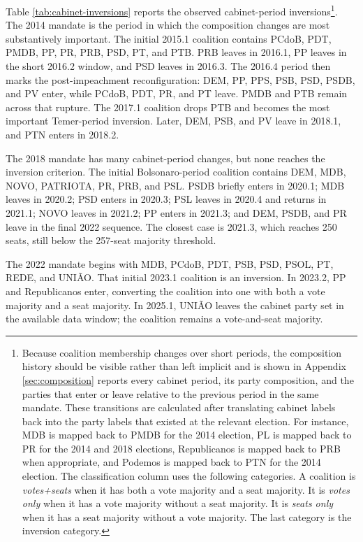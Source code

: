 \documentclass[11pt]{article}
\begin{document}


Table \ref{tab:cabinet-inversions} reports the observed cabinet-period
inversions\footnote{Because coalition membership changes over short periods, the
  composition history should be visible rather than left implicit and is shown
  in Appendix \ref{sec:composition} reports every cabinet period, its party
  composition, and the parties that enter or leave relative to the previous
  period in the same mandate. These transitions are calculated after translating
  cabinet labels back into the party labels that existed at the relevant
  election. For instance, MDB is mapped back to PMDB for the 2014 election, PL
  is mapped back to PR for the 2014 and 2018 elections, Republicanos is mapped
  back to PRB when appropriate, and Podemos is mapped back to PTN for the 2014
  election. The classification column uses the following categories. A coalition
  is \textit{votes+seats} when it has both a vote majority and a seat majority.
  It is \textit{votes only} when it has a vote majority without a seat majority.
  It is \textit{seats only} when it has a seat majority without a vote majority.
  The last category is the inversion category.}. The 2014 mandate is the period
in which the composition changes are most substantively important. The initial
2015.1 coalition contains PCdoB, PDT, PMDB, PP, PR, PRB, PSD, PT, and PTB. PRB
leaves in 2016.1, PP leaves in the short 2016.2 window, and PSD leaves in
2016.3. The 2016.4 period then marks the post-impeachment reconfiguration: DEM,
PP, PPS, PSB, PSD, PSDB, and PV enter, while PCdoB, PDT, PR, and PT leave. PMDB
and PTB remain across that rupture. The 2017.1 coalition drops PTB and becomes
the most important Temer-period inversion. Later, DEM, PSB, and PV leave in
2018.1, and PTN enters in 2018.2.

The 2018 mandate has many cabinet-period changes, but none reaches the inversion
criterion. The initial Bolsonaro-period coalition contains DEM, MDB, NOVO,
PATRIOTA, PR, PRB, and PSL. PSDB briefly enters in 2020.1; MDB leaves in
2020.2; PSD enters in 2020.3; PSL leaves in 2020.4 and returns in 2021.1; NOVO
leaves in 2021.2; PP enters in 2021.3; and DEM, PSDB, and PR leave in the final
2022 sequence. The closest case is 2021.3, which reaches 250 seats, still below
the 257-seat majority threshold.

The 2022 mandate begins with MDB, PCdoB, PDT, PSB, PSD, PSOL, PT, REDE, and
UNIÃO. That initial 2023.1 coalition is an inversion. In 2023.2, PP and
Republicanos enter, converting the coalition into one with both a vote majority
and a seat majority. In 2025.1, UNIÃO leaves the cabinet party set in the
available data window; the coalition remains a vote-and-seat majority.
\end{document}
